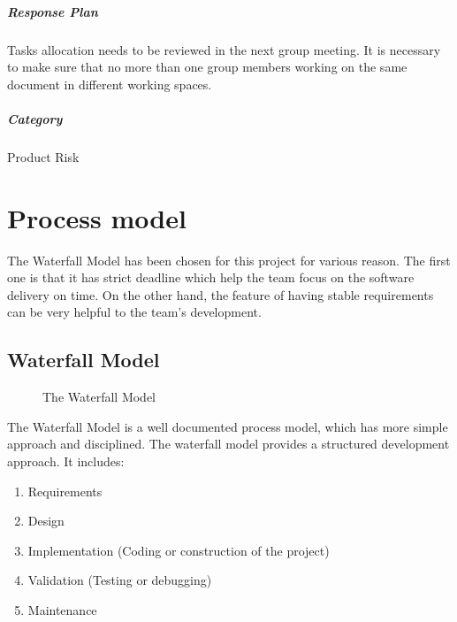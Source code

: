 \documentclass[11pt, a4paper]{report}
\begin{document}
	\paragraph{Response Plan}Tasks allocation needs to be reviewed in the next group meeting. It is necessary to make sure that no more than one group members working on the same document in different working spaces. \\
	\paragraph{Category}Product Risk

\pagebreak
\chapter{Process model}
The Waterfall Model has been chosen for this project for various reason. The first one is that it has strict deadline which help the team focus on the software delivery on time. On the other hand, the feature of having stable requirements can be very helpful to the team's development. 

\section{Waterfall Model}

\begin{figure}[ht]
\centering
\setlength\fboxsep{2pt}
\setlength\fboxrule{0.2pt}
\caption{The Waterfall Model}
\label{sec:WTF}
\label{fig:WTF}
\end{figure}

The Waterfall Model is a well documented process model, which has more simple approach and disciplined. The waterfall model provides a structured development approach. It includes:
\begin{enumerate}
	\item  Requirements
	\item  Design
	\item  Implementation (Coding or construction of the project)
	\item  Validation (Testing or debugging)
	\item  Maintenance
\end{enumerate}
\end{document}
